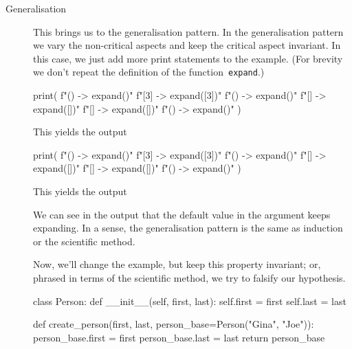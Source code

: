 \begin{description}
  \item[Generalisation] This brings us to the generalisation pattern.
    In the generalisation pattern we vary the non-critical aspects and keep the 
    critical aspect invariant.
    In this case, we just add more print statements to the example.
    (For brevity we don't repeat the definition of the 
    function~\texttt{expand}.)

    \hfill
    \begin{minipage}[t]{0.45\columnwidth}
      \begin{pyblock}[default1]
print(
  f"()  -> {expand()}\n"
  f"[3] -> {expand([3])}\n"
  f"()  -> {expand()}\n"
  f"[]  -> {expand([])}\n"
  f"[]  -> {expand([])}\n"
  f"()  -> {expand()}\n"
)
      \end{pyblock}
      \vspace{0.5em}
      This yields the output
      \vspace{0.5em}
      \printpythontex[verbatim]
    \end{minipage}
    \hfill
    \begin{minipage}[t]{0.45\columnwidth}
      \begin{pyblock}[default2]
print(
  f"()  -> {expand()}\n"
  f"[3] -> {expand([3])}\n"
  f"()  -> {expand()}\n"
  f"[]  -> {expand([])}\n"
  f"[]  -> {expand([])}\n"
  f"()  -> {expand()}\n"
)
      \end{pyblock}

      \vspace{0.5em}
      This yields the output
      \vspace{0.5em}
    \printpythontex[verbatim][highlightlines={1,3,6}]
    \end{minipage}
    \hfill

    We can see in the output that the default value in the argument keeps 
    expanding.
    In a sense, the generalisation pattern is the same as induction or the 
    scientific method.

    Now, we'll change the example, but keep this property invariant;
    or, phrased in terms of the scientific method, we try to falsify our 
    hypothesis.
    \begin{pyblock}[default1][highlightlines={15-16}]
class Person:
  def __init__(self, first, last):
    self.first = first
    self.last = last

def create_person(first, last,
                  person_base=Person("Gina", "Joe")):
  person_base.first = first
  person_base.last = last
  return person_base


\end{pyblock}
\end{description}
